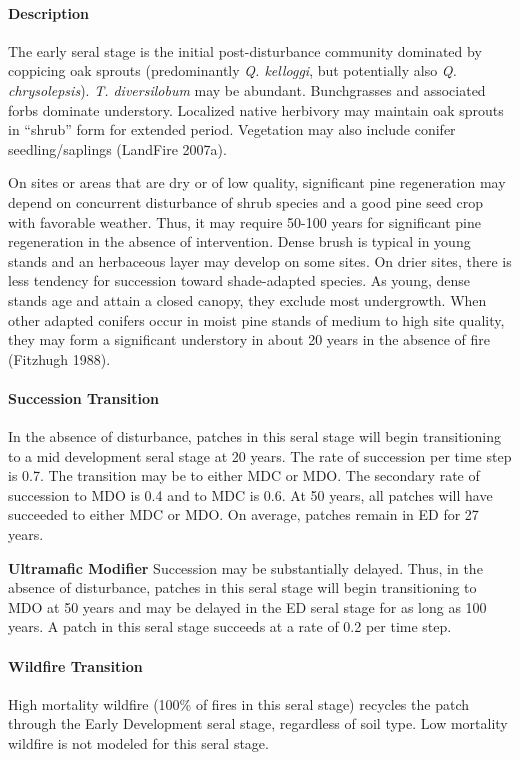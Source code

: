 \paragraph{Description}
The early seral stage is the initial post-disturbance community dominated by coppicing oak sprouts (predominantly \emph{Q. kelloggi}, but potentially also \emph{Q. chrysolepsis}). \emph{T. diversilobum} may be abundant. Bunchgrasses and associated forbs dominate understory. Localized native herbivory may maintain oak sprouts in ``shrub'' form for extended period. Vegetation may also include conifer seedling/saplings (LandFire 2007a).

On sites or areas that are dry or of low quality, significant pine regeneration may depend on concurrent disturbance of shrub species and a good pine seed crop with favorable weather. Thus, it may require 50-100 years for significant pine regeneration in the absence of intervention. Dense brush is typical in young stands and an herbaceous layer may develop on some sites. On drier sites, there is less tendency for succession toward shade-adapted species. As young, dense stands age and attain a closed canopy, they exclude most undergrowth. When other adapted conifers occur in moist pine stands of medium to high site quality, they may form a significant understory in about 20 years in the absence of fire (Fitzhugh 1988).

\paragraph{Succession Transition} In the absence of disturbance, patches in this seral stage will begin transitioning to a mid development seral stage at 20 years. The rate of succession per time step is 0.7. The transition may be to either MDC or MDO. The secondary rate of succession to MDO is 0.4 and to MDC is 0.6. At 50 years, all patches will have succeeded to either MDC or MDO. On average, patches remain in ED for 27 years.
\begin{adjustwidth}{2cm}{}
\medskip
\textbf{Ultramafic Modifier} Succession may be substantially delayed. Thus, in the absence of disturbance, patches in this seral stage will begin transitioning to MDO at 50 years and may be delayed in the ED seral stage for as long as 100 years. A patch in this seral stage succeeds at a rate of 0.2 per time step. 

\end{adjustwidth}
\paragraph{Wildfire Transition}
High mortality wildfire (100\% of fires in this seral stage) recycles the patch through the Early Development seral stage, regardless of soil type. Low mortality wildfire is not modeled for this seral stage.



